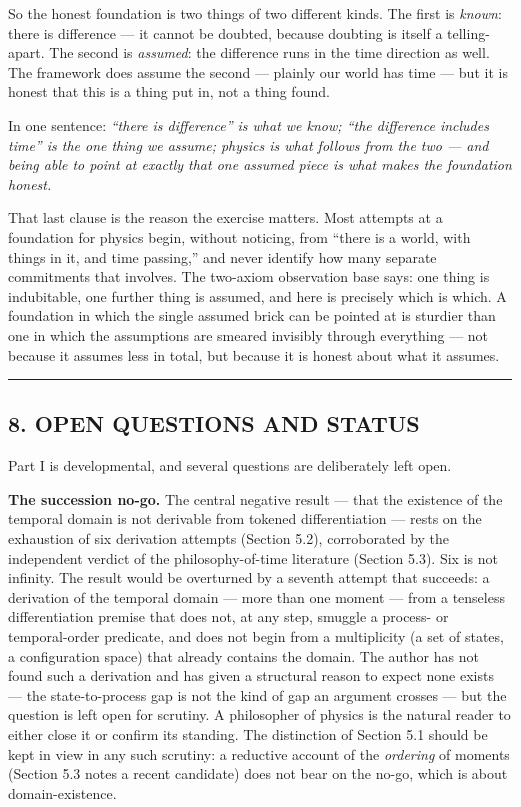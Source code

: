 \documentclass[
]{article}
\begin{document}
So the honest foundation is two things of two different kinds. The first
is \emph{known}: there is difference --- it cannot be doubted, because
doubting is itself a telling-apart. The second is \emph{assumed}: the
difference runs in the time direction as well. The framework does assume
the second --- plainly our world has time --- but it is honest that this
is a thing put in, not a thing found.

In one sentence: \emph{``there is difference'' is what we know; ``the
difference includes time'' is the one thing we assume; physics is what
follows from the two --- and being able to point at exactly that one
assumed piece is what makes the foundation honest.}

That last clause is the reason the exercise matters. Most attempts at a
foundation for physics begin, without noticing, from ``there is a world,
with things in it, and time passing,'' and never identify how many
separate commitments that involves. The two-axiom observation base says:
one thing is indubitable, one further thing is assumed, and here is
precisely which is which. A foundation in which the single assumed brick
can be pointed at is sturdier than one in which the assumptions are
smeared invisibly through everything --- not because it assumes less in
total, but because it is honest about what it assumes.

\begin{center}\rule{0.5\linewidth}{0.5pt}\end{center}

\hypertarget{open-questions-and-status}{%
\subsection{8. OPEN QUESTIONS AND
STATUS}\label{open-questions-and-status}}

Part I is developmental, and several questions are deliberately left
open.

\textbf{The succession no-go.} The central negative result --- that the
existence of the temporal domain is not derivable from tokened
differentiation --- rests on the exhaustion of six derivation attempts
(Section 5.2), corroborated by the independent verdict of the
philosophy-of-time literature (Section 5.3). Six is not infinity. The
result would be overturned by a seventh attempt that succeeds: a
derivation of the temporal domain --- more than one moment --- from a
tenseless differentiation premise that does not, at any step, smuggle a
process- or temporal-order predicate, and does not begin from a
multiplicity (a set of states, a configuration space) that already
contains the domain. The author has not found such a derivation and has
given a structural reason to expect none exists --- the state-to-process
gap is not the kind of gap an argument crosses --- but the question is
left open for scrutiny. A philosopher of physics is the natural reader
to either close it or confirm its standing. The distinction of Section
5.1 should be kept in view in any such scrutiny: a reductive account of
the \emph{ordering} of moments (Section 5.3 notes a recent candidate)
does not bear on the no-go, which is about domain-existence.
\end{document}
